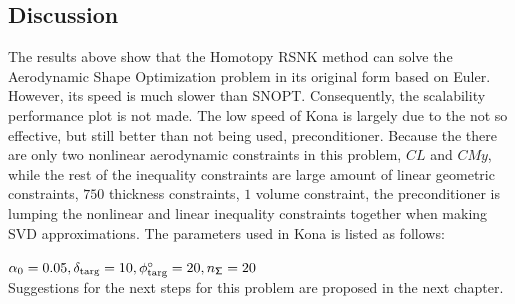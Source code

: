 \subsection{Discussion}
The results above show that the Homotopy RSNK method can solve the Aerodynamic Shape Optimization 
problem in its original form based on Euler. However, its speed is much slower than SNOPT. Consequently, 
the scalability performance plot is not made. The low speed of Kona is largely due to the not so effective, but still 
better than not being used, preconditioner. Because the there are only two nonlinear aerodynamic constraints in this problem, $CL$ and $CMy$, while the rest of the inequality constraints are large amount of linear geometric constraints, $750$ thickness constraints, $1$ volume constraint, the preconditioner is lumping the nonlinear and linear inequality constraints together when making SVD approximations.  The parameters used in Kona is listed as follows: 

$\alpha_0=0.05,  \delta_{\text{targ}}=10, \phi^{\circ}_{\text{targ}}=20, n_{\mathsf{\Sigma}}=20 $ \\

Suggestions for the next steps for this problem are proposed in the next chapter. 


